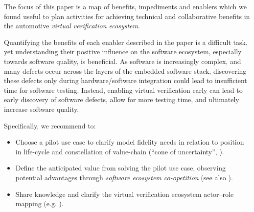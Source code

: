 The focus of this paper is a map of benefits, impediments and enablers which we found useful to plan activities for achieving technical and collaborative benefits in the automotive \emph{virtual verification ecosystem}.

Quantifying the benefits of each enabler described in the paper is a difficult task,
yet understanding their positive influence on the software ecosystem, especially towards software quality, is beneficial.
As software is increasingly complex, and many defects occur across the layers of the embedded software stack, discovering these defects only during hardware/software integration could lead to %
insufficient time for software testing.
Instead, enabling %
virtual verification %
early %
can lead to early discovery of software defects, %
allow for more testing time, %
and ultimately increase software quality.

Specifically, we recommend to:
\begin{itemize}
    \item Choose a pilot use case to clarify model fidelity needs in relation to position in life-cycle and constellation of value-chain (``cone of uncertainty'', \cite{Boehm1981}).
    \item Define the anticipated value from solving the pilot use case, observing potential advantages through \emph{software ecosystem co-opetition} (see also \cite{Agerfalk2008}).
    \item %
    {Share} knowledge and clarify %
    the {virtual verification ecosystem} actor--role mapping (e.g. \cite{kilamo2012proprietary}).
\end{itemize}

